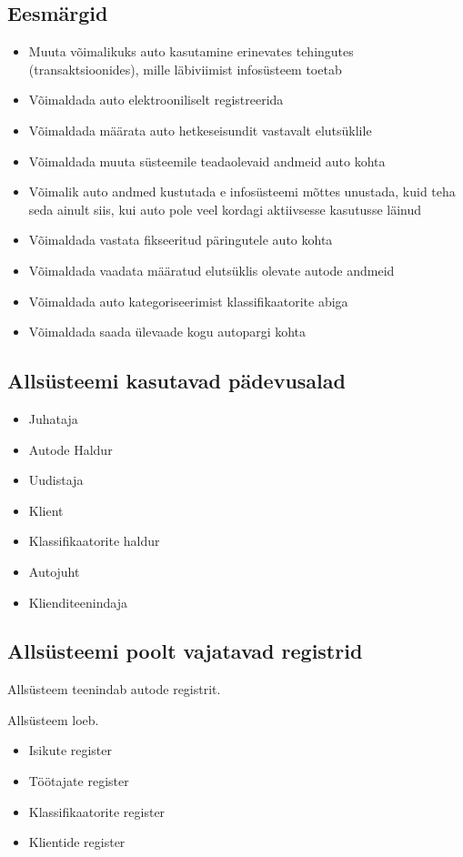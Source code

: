 \subsection{Eesmärgid}
\begin{itemize}
	\item Muuta võimalikuks auto kasutamine erinevates tehingutes (transaktsioonides), mille läbiviimist infosüsteem toetab
	\item Võimaldada auto elektrooniliselt registreerida
	\item Võimaldada määrata auto hetkeseisundit vastavalt elutsüklile
	\item Võimaldada muuta süsteemile teadaolevaid andmeid auto kohta
	\item Võimalik auto andmed kustutada e infosüsteemi mõttes unustada, kuid teha seda ainult siis, kui auto pole veel kordagi aktiivsesse kasutusse läinud
	\item Võimaldada vastata fikseeritud päringutele auto kohta
	\item Võimaldada vaadata määratud elutsüklis olevate autode andmeid
	\item Võimaldada auto kategoriseerimist klassifikaatorite abiga
	\item Võimaldada saada ülevaade kogu autopargi kohta
\end{itemize}

\subsection{Allsüsteemi kasutavad pädevusalad}
\begin{itemize}
	\item Juhataja
	\item Autode Haldur
	\item Uudistaja
	\item Klient
	\item Klassifikaatorite haldur
	\item Autojuht
	\item Klienditeenindaja
\end{itemize}

\subsection{Allsüsteemi poolt vajatavad registrid}
Allsüsteem teenindab autode registrit.
\\
\par
Allsüsteem loeb.
\begin{itemize}
	\item Isikute register
	\item Töötajate register
	\item Klassifikaatorite register
	\item Klientide register
\end{itemize}

